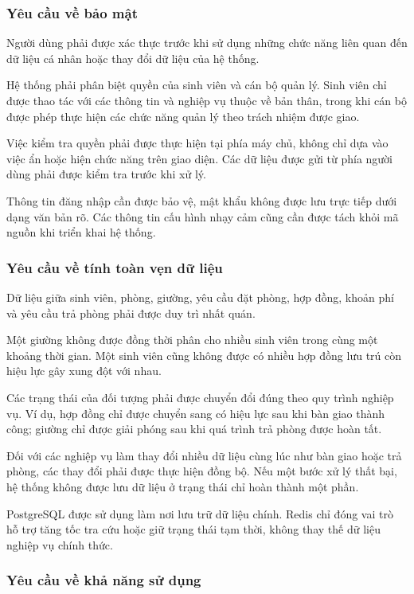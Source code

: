 \subsubsection{Yêu cầu về bảo mật}

Người dùng phải được xác thực trước khi sử dụng những chức năng liên quan đến dữ liệu cá nhân hoặc thay đổi dữ liệu của hệ thống.

Hệ thống phải phân biệt quyền của sinh viên và cán bộ quản lý. Sinh viên chỉ được thao tác với các thông tin và nghiệp vụ thuộc về bản thân, trong khi cán bộ được phép thực hiện các chức năng quản lý theo trách nhiệm được giao.

Việc kiểm tra quyền phải được thực hiện tại phía máy chủ, không chỉ dựa vào việc ẩn hoặc hiện chức năng trên giao diện. Các dữ liệu được gửi từ phía người dùng phải được kiểm tra trước khi xử lý.

Thông tin đăng nhập cần được bảo vệ, mật khẩu không được lưu trực tiếp dưới dạng văn bản rõ. Các thông tin cấu hình nhạy cảm cũng cần được tách khỏi mã nguồn khi triển khai hệ thống.

\subsubsection{Yêu cầu về tính toàn vẹn dữ liệu}

Dữ liệu giữa sinh viên, phòng, giường, yêu cầu đặt phòng, hợp đồng, khoản phí và yêu cầu trả phòng phải được duy trì nhất quán.

Một giường không được đồng thời phân cho nhiều sinh viên trong cùng một khoảng thời gian. Một sinh viên cũng không được có nhiều hợp đồng lưu trú còn hiệu lực gây xung đột với nhau.

Các trạng thái của đối tượng phải được chuyển đổi đúng theo quy trình nghiệp vụ. Ví dụ, hợp đồng chỉ được chuyển sang có hiệu lực sau khi bàn giao thành công; giường chỉ được giải phóng sau khi quá trình trả phòng được hoàn tất.

Đối với các nghiệp vụ làm thay đổi nhiều dữ liệu cùng lúc như bàn giao hoặc trả phòng, các thay đổi phải được thực hiện đồng bộ. Nếu một bước xử lý thất bại, hệ thống không được lưu dữ liệu ở trạng thái chỉ hoàn thành một phần.

PostgreSQL được sử dụng làm nơi lưu trữ dữ liệu chính. Redis chỉ đóng vai trò hỗ trợ tăng tốc tra cứu hoặc giữ trạng thái tạm thời, không thay thế dữ liệu nghiệp vụ chính thức.

\subsubsection{Yêu cầu về khả năng sử dụng}

